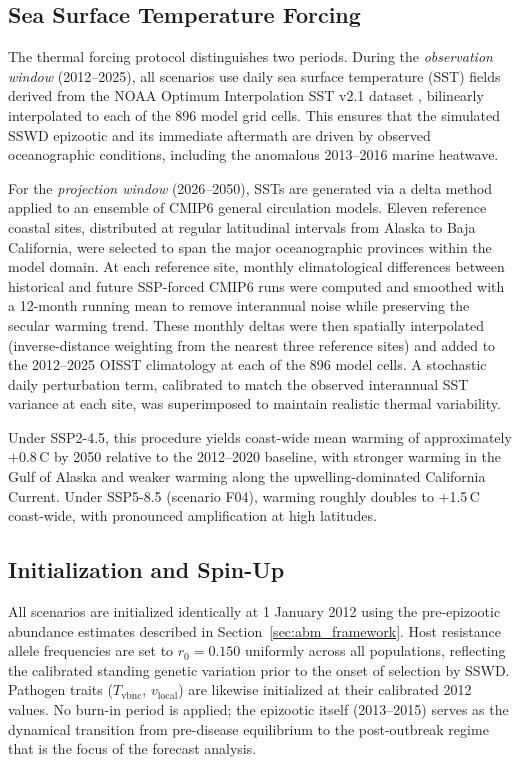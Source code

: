 \subsection{Sea Surface Temperature Forcing}
\label{sec:sst_forcing}

The thermal forcing protocol distinguishes two periods.  During the
\textit{observation window} (2012--2025), all scenarios use
daily sea surface temperature (SST) fields derived from the NOAA
Optimum Interpolation SST v2.1 dataset \citep{reynolds2007,
huang2021}, bilinearly interpolated to each of the 896 model grid
cells.  This ensures that the simulated SSWD epizootic and its
immediate aftermath are driven by observed oceanographic conditions,
including the anomalous 2013--2016 marine heatwave.

For the \textit{projection window} (2026--2050), SSTs are generated
via a delta method applied to an ensemble of CMIP6 general circulation
models.  Eleven reference coastal sites, distributed at regular
latitudinal intervals from Alaska to Baja California, were selected to
span the major oceanographic provinces within the model domain.  At
each reference site, monthly climatological differences between
historical and future SSP-forced CMIP6 runs were computed and smoothed
with a 12-month running mean to remove interannual noise while
preserving the secular warming trend.  These monthly deltas were then
spatially interpolated (inverse-distance weighting from the nearest
three reference sites) and added to the 2012--2025 OISST climatology
at each of the 896 model cells.  A stochastic daily perturbation term,
calibrated to match the observed interannual SST variance at each
site, was superimposed to maintain realistic thermal variability.

Under SSP2-4.5, this procedure yields coast-wide mean warming of
approximately $+$0.8\,\textdegree C by 2050 relative to the
2012--2020 baseline, with stronger warming in the Gulf of Alaska and
weaker warming along the upwelling-dominated California Current.
Under SSP5-8.5 (scenario F04), warming roughly doubles to
$+$1.5\,\textdegree C coast-wide, with pronounced amplification at
high latitudes.

\subsection{Initialization and Spin-Up}

All scenarios are initialized identically at 1 January 2012 using the
pre-epizootic abundance estimates described in Section~\ref{sec:abm_framework}.
Host resistance allele frequencies are set to $r_0 = 0.150$ uniformly
across all populations, reflecting the calibrated standing genetic
variation prior to the onset of selection by SSWD.  Pathogen traits
($T_\mathrm{vbnc}$, $v_\mathrm{local}$) are likewise initialized at
their calibrated 2012 values.  No burn-in period is applied; the
epizootic itself (2013--2015) serves as the dynamical transition from
pre-disease equilibrium to the post-outbreak regime that is the focus
of the forecast analysis.
